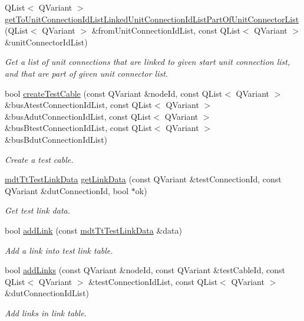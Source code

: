 \begin{DoxyCompactItemize}
Q\-List$<$ Q\-Variant $>$ \hyperlink{classmdt_tt_logical_test_cable_a650842c7b4daf810e0387b4119e714a1}{get\-To\-Unit\-Connection\-Id\-List\-Linked\-Unit\-Connection\-Id\-List\-Part\-Of\-Unit\-Connector\-List} (Q\-List$<$ Q\-Variant $>$ \&from\-Unit\-Connection\-Id\-List, const Q\-List$<$ Q\-Variant $>$ \&unit\-Connector\-Id\-List)
\begin{DoxyCompactList}\small\item\em Get a list of unit connections that are linked to given start unit connection list, and that are part of given unit connector list. \end{DoxyCompactList}\item 
bool \hyperlink{classmdt_tt_logical_test_cable_a2ce5a1cc0b806878629cb07fe23c6731}{create\-Test\-Cable} (const Q\-Variant \&node\-Id, const Q\-List$<$ Q\-Variant $>$ \&bus\-Atest\-Connection\-Id\-List, const Q\-List$<$ Q\-Variant $>$ \&bus\-Adut\-Connection\-Id\-List, const Q\-List$<$ Q\-Variant $>$ \&bus\-Btest\-Connection\-Id\-List, const Q\-List$<$ Q\-Variant $>$ \&bus\-Bdut\-Connection\-Id\-List)
\begin{DoxyCompactList}\small\item\em Create a test cable. \end{DoxyCompactList}\item 
\hyperlink{classmdt_tt_test_link_data}{mdt\-Tt\-Test\-Link\-Data} \hyperlink{classmdt_tt_logical_test_cable_a76c9af0e54d11f38ce1665b679a9ffd7}{get\-Link\-Data} (const Q\-Variant \&test\-Connection\-Id, const Q\-Variant \&dut\-Connection\-Id, bool $\ast$ok)
\begin{DoxyCompactList}\small\item\em Get test link data. \end{DoxyCompactList}\item 
bool \hyperlink{classmdt_tt_logical_test_cable_ab632b572837378da92a73350e95cc0ec}{add\-Link} (const \hyperlink{classmdt_tt_test_link_data}{mdt\-Tt\-Test\-Link\-Data} \&data)
\begin{DoxyCompactList}\small\item\em Add a link into test link table. \end{DoxyCompactList}\item 
bool \hyperlink{classmdt_tt_logical_test_cable_a3f0d93449a85ec52e0ae796eb3e7cb1d}{add\-Links} (const Q\-Variant \&node\-Id, const Q\-Variant \&test\-Cable\-Id, const Q\-List$<$ Q\-Variant $>$ \&test\-Connection\-Id\-List, const Q\-List$<$ Q\-Variant $>$ \&dut\-Connection\-Id\-List)
\begin{DoxyCompactList}\small\item\em Add links in link table. \end{DoxyCompactList}\item 

\end{DoxyCompactItemize}
